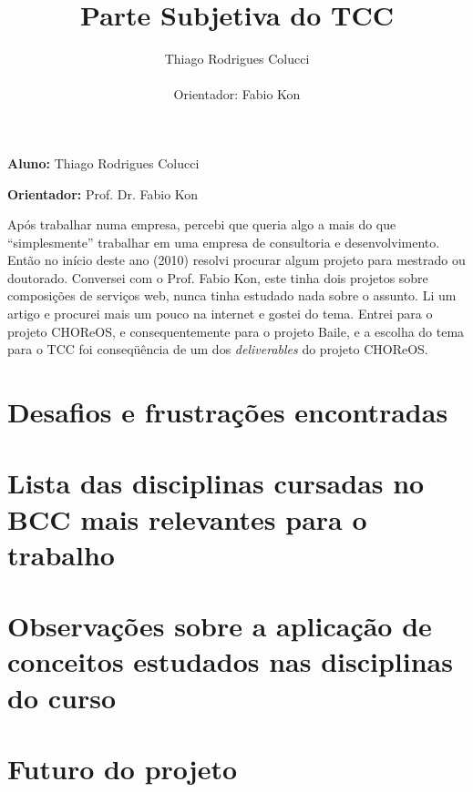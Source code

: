 \documentclass[11pt,a4paper]{article}
\title{Parte Subjetiva do TCC}
\author{Thiago Rodrigues Colucci\\\\Orientador: Fabio Kon}
\begin{document}
\maketitle

\newpage

\tableofcontents
\newpage
\textbf{Aluno:} Thiago Rodrigues Colucci

\textbf{Orientador:} Prof. Dr. Fabio Kon


Após trabalhar numa empresa, percebi que queria algo a mais do que ``simplesmente'' trabalhar em uma empresa de consultoria e desenvolvimento. Então no início deste ano (2010) resolvi procurar algum projeto para mestrado ou doutorado. Conversei com o Prof. Fabio Kon, este tinha dois projetos sobre composições de serviços web, nunca tinha estudado nada sobre o assunto. Li um artigo e procurei mais um pouco na internet e gostei do tema. Entrei para o projeto CHOReOS, e consequentemente para o projeto Baile, e a escolha do tema para o TCC foi conseqüência de um dos \emph{deliverables} do projeto CHOReOS.



\section{ Desafios e frustrações encontradas}





\section{Lista das disciplinas cursadas no BCC mais relevantes para o trabalho}







\section{Observações sobre a aplicação de conceitos estudados nas disciplinas do curso}






\section{Futuro do projeto}
\end{document}

